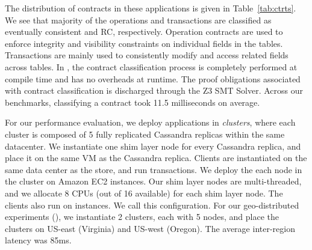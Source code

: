 The distribution of contracts in these applications is given in
Table~\ref{tab:ctrts}. We see that majority of the operations and transactions
are classified as eventually consistent and RC, respectively. Operation
contracts are used to enforce integrity and visibility constraints on
individual fields in the tables. Transactions are mainly used to consistently
modify and access related fields across tables. In \quelea, the contract
classification process is completely performed at compile time and has no
overheads at runtime. The proof obligations associated with contract
classification is discharged through the Z3 SMT Solver. Across our benchmarks,
classifying a contract took 11.5 milliseconds on average.

For our performance evaluation, we deploy \quelea applications in
\emph{clusters}, where each cluster is composed of 5 fully replicated Cassandra
replicas within the same datacenter. We instantiate one shim layer node for
every Cassandra replica, and place it on the same VM as the Cassandra replica.
Clients are instantiated on the same data center as the store, and run
transactions. We deploy the each node in the cluster on  Amazon
EC2 instances. Our shim layer nodes are multi-threaded, and we allocate 8 CPUs
(out of 16 available) for each shim layer node. The clients also run on
 instances. We call this  configuration. For our
geo-distributed experiments (), we instantiate 2 clusters, each with 5
nodes, and place the clusters on US-east (Virginia) and US-west (Oregon). The
average inter-region latency was 85ms.

